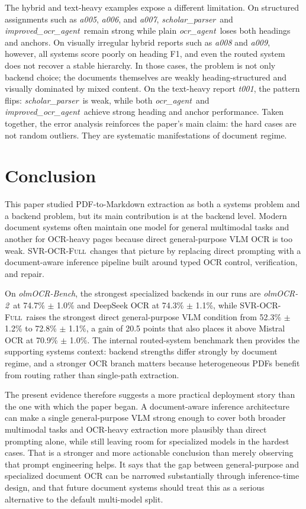 \documentclass[conference]{IEEEtran}
\newcommand{\papername}[1]{\textit{#1}}
\newcommand{\scholar}{\papername{scholar\_parser}}
\newcommand{\ocragent}{\papername{ocr\_agent}}
\newcommand{\improvedocr}{\papername{improved\_ocr\_agent}}
\newcommand{\svrocr}{\textsc{SVR-OCR-Full}}
\newcommand{\olmocr}{\papername{olmOCR-2}}
\begin{document}
The hybrid and text-heavy examples expose a different limitation. On structured assignments such as \papername{a005}, \papername{a006}, and \papername{a007}, \scholar\ and \improvedocr\ remain strong while plain \ocragent\ loses both headings and anchors. On visually irregular hybrid reports such as \papername{a008} and \papername{a009}, however, all systems score poorly on heading F1, and even the routed system does not recover a stable hierarchy. In those cases, the problem is not only backend choice; the documents themselves are weakly heading-structured and visually dominated by mixed content. On the text-heavy report \papername{t001}, the pattern flips: \scholar\ is weak, while both \ocragent\ and \improvedocr\ achieve strong heading and anchor performance. Taken together, the error analysis reinforces the paper's main claim: the hard cases are not random outliers. They are systematic manifestations of document regime.

\section{Conclusion}

This paper studied PDF-to-Markdown extraction as both a systems problem and a backend problem, but its main contribution is at the backend level. Modern document systems often maintain one model for general multimodal tasks and another for OCR-heavy pages because direct general-purpose VLM OCR is too weak. \svrocr\ changes that picture by replacing direct prompting with a document-aware inference pipeline built around typed OCR control, verification, and repair.

On \papername{olmOCR-Bench}, the strongest specialized backends in our runs are \olmocr\ at 74.7\% $\pm$ 1.0\% and DeepSeek OCR at 74.3\% $\pm$ 1.1\%, while \svrocr\ raises the strongest direct general-purpose VLM condition from 52.3\% $\pm$ 1.2\% to 72.8\% $\pm$ 1.1\%, a gain of 20.5 points that also places it above Mistral OCR at 70.9\% $\pm$ 1.0\%. The internal routed-system benchmark then provides the supporting systems context: backend strengths differ strongly by document regime, and a stronger OCR branch matters because heterogeneous PDFs benefit from routing rather than single-path extraction.

The present evidence therefore suggests a more practical deployment story than the one with which the paper began. A document-aware inference architecture can make a single general-purpose VLM strong enough to cover both broader multimodal tasks and OCR-heavy extraction more plausibly than direct prompting alone, while still leaving room for specialized models in the hardest cases. That is a stronger and more actionable conclusion than merely observing that prompt engineering helps. It says that the gap between general-purpose and specialized document OCR can be narrowed substantially through inference-time design, and that future document systems should treat this as a serious alternative to the default multi-model split.



\end{document}
